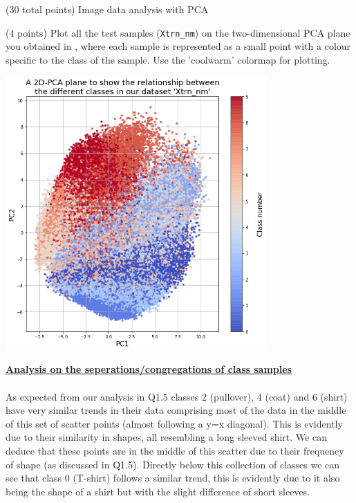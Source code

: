 \documentclass[12pt]{article}
\begin{document}
\begin{question}{(30 total points) Image data analysis with PCA}
\begin{subquestion}
   \end{subquestion}
   \begin{subquestion}{(4 points)
       Plot all the test samples (\texttt{Xtrn\_nm}) on the
       two-dimensional PCA plane you obtained in , where each sample is
       represented as a small point with a colour specific to the class of
       the sample.  Use the 'coolwarm' colormap for plotting.
     } \label{Q1.8}


   

      \begin{answerbox}{40em}
        \begin{center}
        \includegraphics[width=0.75\textwidth]{images/q18.png}
        \end{center}
        \footnotesize{\textbf{\underline{Analysis on the seperations/congregations of class samples}}}\\
        \\
        \scriptsize{
        As expected from our analysis in Q1.5 classes 2 (pullover), 4 (coat) and 6 (shirt) have very similar trends in their data comprising most of the data in the middle of this set of scatter points (almost following a y=x diagonal). This is evidently due to their similarity in shapes, all resembling a long sleeved shirt. We can deduce that these points are in the middle of this scatter due to their frequency of shape (as discussed in Q1.5). Directly below this collection of classes we can see that class 0 (T-shirt) follows a similar trend, this is evidently due to it also being the shape of a shirt but with the slight difference of short sleeves.\\
}
\end{answerbox}
\end{subquestion}
\end{question}
\end{document}
